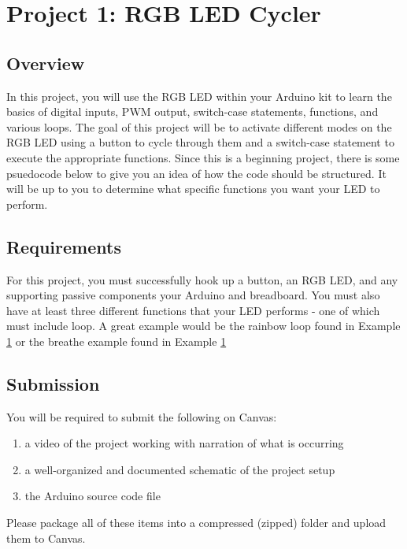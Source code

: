 %

\chapter{Project 1: RGB LED Cycler}

\section*{Overview}

In this project, you will use the RGB LED within your Arduino kit to learn the basics of digital inputs, PWM output, switch-case statements, functions, and various loops.
The goal of this project will be to activate different modes on the RGB LED using a button to cycle through them and a switch-case statement to execute the appropriate functions.
Since this is a beginning project, there is some psuedocode below to give you an idea of how the code should be structured.
It will be up to you to determine what specific functions you want your LED to perform.

\section*{Requirements}

For this project, you must successfully hook up a button, an RGB LED, and any supporting passive components your Arduino and breadboard.
You must also have at least three different functions that your LED performs - one of which must include loop. A great example would be the rainbow loop found in Example \ref{} or the breathe example found in Example \ref{} 

\section*{Submission}

You will be required to submit the following on Canvas:
\begin{enumerate}
    \item a video of the project working with narration of what is occurring
    \item a well-organized and documented schematic of the project setup
    \item the Arduino source code file
\end{enumerate}
Please package all of these items into a compressed (zipped) folder and upload them to Canvas.


